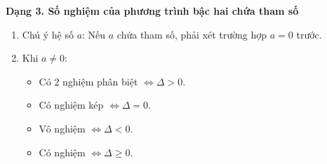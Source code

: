 \textbf{Dạng 3. Số nghiệm của phương trình bậc hai chứa tham số}
\begin{enumerate}
\item Chú ý hệ số $a$: Nếu $a$ chứa tham số, phải xét trường hợp $a = 0$ trước.
\item Khi $a \ne 0$:
\begin{itemize}
\item Có $2$ nghiệm phân biệt $\iff \Delta > 0$.
\item Có nghiệm kép $\iff \Delta = 0$.
\item Vô nghiệm $\iff \Delta < 0$.
\item Có nghiệm $\iff \Delta \ge 0$.
\end{itemize}
\end{enumerate}
